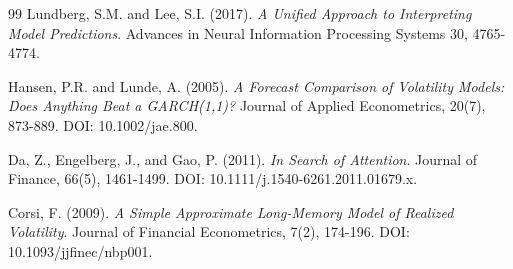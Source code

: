\documentclass[12pt,a4paper]{article}
\begin{document}
\begin{thebibliography}{99}
Lundberg, S.M. and Lee, S.I. (2017).
\textit{A Unified Approach to Interpreting Model Predictions}.
Advances in Neural Information Processing Systems 30, 4765-4774.

Hansen, P.R. and Lunde, A. (2005).
\textit{A Forecast Comparison of Volatility Models: Does Anything Beat a GARCH(1,1)?}
Journal of Applied Econometrics, 20(7), 873-889. DOI: 10.1002/jae.800.

Da, Z., Engelberg, J., and Gao, P. (2011).
\textit{In Search of Attention}.
Journal of Finance, 66(5), 1461-1499. DOI: 10.1111/j.1540-6261.2011.01679.x.

Corsi, F. (2009).
\textit{A Simple Approximate Long-Memory Model of Realized Volatility}.
Journal of Financial Econometrics, 7(2), 174-196. DOI: 10.1093/jjfinec/nbp001.

\end{thebibliography}
\end{document}
